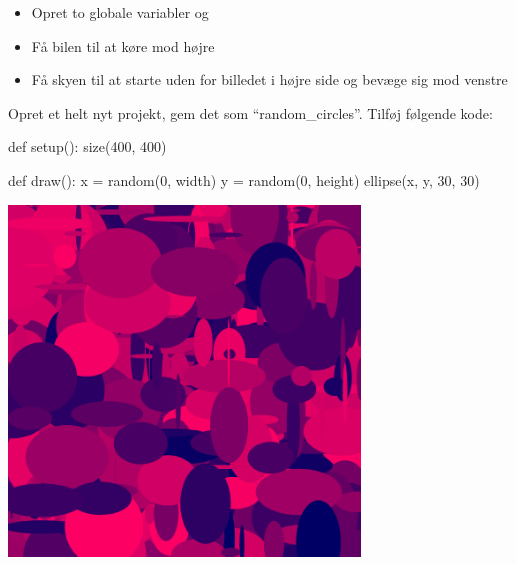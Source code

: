 \documentclass{ucph-handout}
\begin{document}
\begin{exercisebox}[adjusted title= Green City forstat]
\begin{itemize}
\item Opret to globale variabler  og 
\item Få bilen til at køre mod højre
\item Få skyen til at starte uden for billedet i højre side og bevæge sig mod venstre
\end{itemize}
\end{exercisebox}


\begin{exercisebox}[adjusted title= Tilfældighed]
Opret et helt nyt projekt, gem det som ``random\_circles''. Tilføj følgende kode:
\begin{minipage}{0.60\linewidth}
\begin{python}
def setup():
    size(400, 400)

def draw():
    x = random(0, width)
    y = random(0, height)
    ellipse(x, y, 30, 30)
\end{python}
\end{minipage}

\begin{minipage}{0.40\linewidth}
\includegraphics[width=0.70\textwidth]{illustrationer/randomcircles.png}
\end{minipage}
~
\end{exercisebox}


\end{document}
